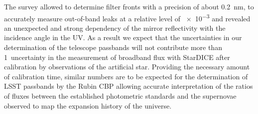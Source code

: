 The survey allowed to determine filter fronts with a precision of
about 0.2~nm, to accurately measure out-of-band leaks at a relative level of
\num{e-3} and revealed an unexpected and strong dependency of the
mirror reflectivity with the incidence angle in the UV. As a result we
expect that the uncertainties in our determination of the telescope
passbands will not contribute more than 1\textperthousand\
uncertainty in the measurement of broadband flux with StarDICE after
calibration by observations of the artificial star. Providing the necessary
amount of calibration time, similar numbers are
to be expected for the determination of LSST passbands by the Rubin
CBP allowing accurate interpretation of the ratios of fluxes between
the established photometric standards and the supernovae observed to map the
expansion history of the universe.

